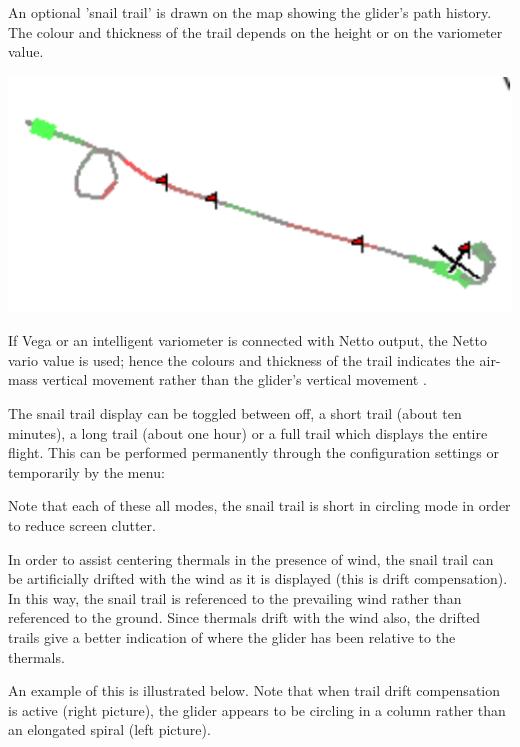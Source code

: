 \documentclass[a4paper,12pt]{refrep}
\begin{document}
An optional 'snail trail' is drawn on the map showing the glider's
path history.  The colour and thickness of the trail depends on the height or
on the variometer value.  

\begin{center}
\includegraphics[angle=0,width=0.8\linewidth,keepaspectratio='true']{figures/snail.pdf}
\end{center}

If Vega or an intelligent variometer is connected with Netto output,
the Netto vario value is used; hence the colours and thickness of the
trail indicates the air-mass vertical movement rather than the glider's
vertical movement .

The snail trail display can be toggled between off, a short trail
(about ten minutes), a long trail (about one hour) or a full trail
which displays the entire flight.  This can be performed permanently
through the configuration  settings or temporarily by the
menu:
\begin{quote}
\blink{}\blink{}
\end{quote}

Note that each of these all modes, the snail trail is short in
circling mode in order to  reduce screen clutter.

In order to assist centering thermals in the presence of wind, the
snail trail can be artificially drifted with the wind as it is
displayed (this is drift compensation).  In this way, the snail trail
is referenced to the prevailing wind rather than referenced to the
ground.  Since thermals drift with the wind also, the drifted trails
give a better indication of where the glider has been relative to the
thermals.

An example of this is illustrated below.  Note that when trail drift
compensation is active (right picture), the glider appears to be
circling in a column rather than an elongated spiral (left picture).
\end{document}
